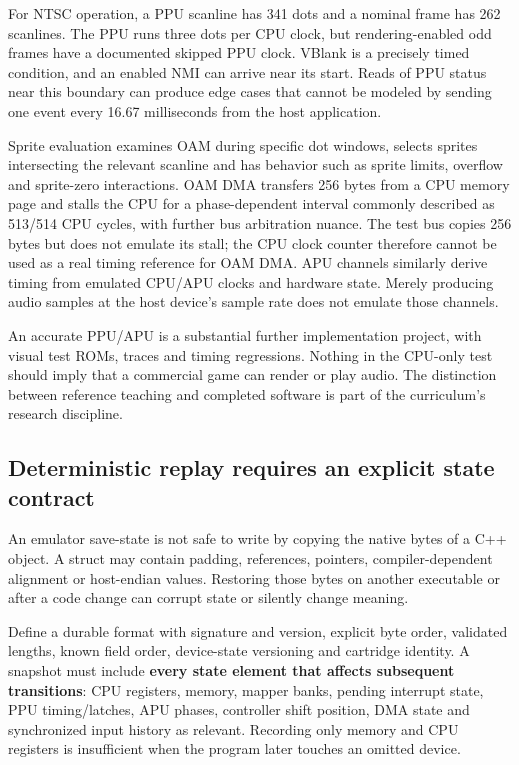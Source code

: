 For NTSC operation, a PPU scanline has 341 dots and a nominal frame has 262 scanlines. The PPU runs three dots per CPU clock, but rendering-enabled odd frames have a documented skipped PPU clock. VBlank is a precisely timed condition, and an enabled NMI can arrive near its start. Reads of PPU status near this boundary can produce edge cases that cannot be modeled by sending one event every 16.67 milliseconds from the host application.

Sprite evaluation examines OAM during specific dot windows, selects sprites intersecting the relevant scanline and has behavior such as sprite limits, overflow and sprite-zero interactions. OAM DMA transfers 256 bytes from a CPU memory page and stalls the CPU for a phase-dependent interval commonly described as 513/514 CPU cycles, with further bus arbitration nuance. The test bus copies 256 bytes but does not emulate its stall; the CPU clock counter therefore cannot be used as a real timing reference for OAM DMA. APU channels similarly derive timing from emulated CPU/APU clocks and hardware state. Merely producing audio samples at the host device's sample rate does not emulate those channels.

An accurate PPU/APU is a substantial further implementation project, with visual test ROMs, traces and timing regressions. Nothing in the CPU-only test should imply that a commercial game can render or play audio. The distinction between reference teaching and completed software is part of the curriculum's research discipline.

\subsection{Deterministic replay requires an explicit state contract}\label{06-engine-ii-ch042-deterministic-replay-requires-an-explicit-state-contract}

\hypertarget{06-engine-ii-ch042-deterministic-replay-requires-an-explicit-state-contract}{}

An emulator save-state is not safe to write by copying the native bytes of a C++ object. A struct may contain padding, references, pointers, compiler-dependent alignment or host-endian values. Restoring those bytes on another executable or after a code change can corrupt state or silently change meaning.

Define a durable format with signature and version, explicit byte order, validated lengths, known field order, device-state versioning and cartridge identity. A snapshot must include \textbf{every state element that affects subsequent transitions}: CPU registers, memory, mapper banks, pending interrupt state, PPU timing/latches, APU phases, controller shift position, DMA state and synchronized input history as relevant. Recording only memory and CPU registers is insufficient when the program later touches an omitted device.

